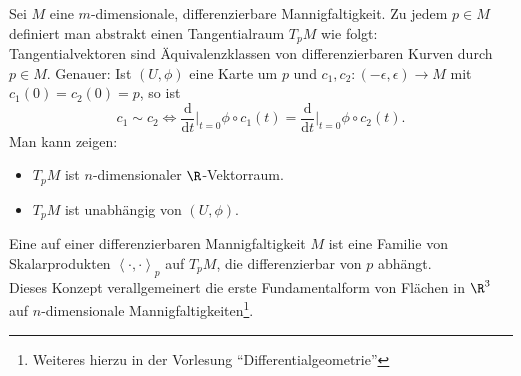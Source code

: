 Sei \( M \) eine \( m \)-dimensionale, differenzierbare Mannigfaltigkeit. Zu jedem \( p \in M \) definiert man abstrakt einen Tangentialraum \( T_p M \) wie folgt: \\
Tangentialvektoren sind Äquivalenzklassen von differenzierbaren Kurven durch \( p \in M \). Genauer: Ist \( (U, \phi) \) eine Karte um \( p \) und \( c_1, c_2: (-\epsilon, \epsilon) \to M \) mit \( c_1(0) = c_2(0) = p \), so ist
\begin{equation*}
  c_1 \sim c_2 \Leftrightarrow \frac{\text{d}}{\text{d}t}\vert_{t = 0} \phi \circ c_1(t) = \frac{\text{d}}{\text{d}t}\vert_{t = 0} \phi \circ c_2(t)\text{.}
\end{equation*}
Man kann zeigen:
\begin{itemize}
  \item \( T_p M \) ist \( n \)-dimensionaler \( \R \)-Vektorraum.
  \item \( T_p M \) ist unabhängig von \( (U, \phi) \).
\end{itemize}

\begin{definition}
  Eine  auf einer differenzierbaren Mannigfaltigkeit \( M \) ist eine Familie von Skalarprodukten \( \left\langle \cdot,\cdot \right\rangle_p \) auf \( T_p M \), die differenzierbar von \( p \) abhängt. \\
  Dieses Konzept verallgemeinert die erste Fundamentalform von Flächen in \( \R^3 \) auf \( n \)-dimensionale Mannigfaltigkeiten\footnote{Weiteres hierzu in der Vorlesung ``Differentialgeometrie''}.
\end{definition}

